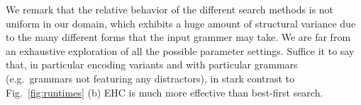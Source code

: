 We remark that the relative behavior of the different search methods
is not uniform in our domain, which exhibits a huge amount of
structural variance due to the many different forms that the input
grammer may take. We are far from an exhaustive exploration of all the
possible parameter settings. Suffice it to say that, in particular
encoding variants and with particular grammars (e.g.\ grammars not
featuring any distractors), in stark contrast to
Fig.~\ref{fig:runtimes} (b) EHC is much more effective than best-first
search.




